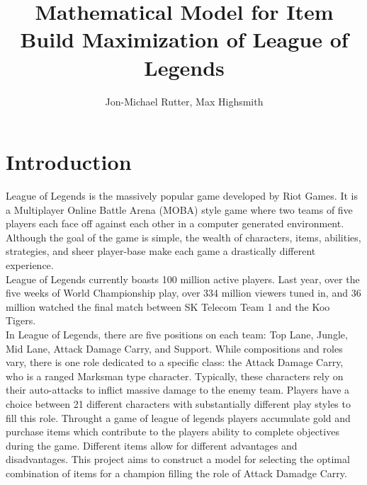 \documentclass{article}
\begin{document}
\title{Mathematical Model for Item Build Maximization of League of Legends}
\author{Jon-Michael Rutter,  Max Highsmith}

\maketitle

\begin{abstract}

\end{abstract}

\section{Introduction}
League of Legends is the massively popular game developed by Riot Games.  It is a Multiplayer Online Battle Arena (MOBA) style game where two teams of five players each face off against each other in a computer generated environment.  Although the goal of the game is simple, the wealth of characters, items, abilities, strategies, and sheer player-base make each game a drastically different experience. \\
League of Legends currently boasts 100 million active players.  Last year, over the five weeks of World Championship play, over 334 million viewers tuned in, and 36 million watched the final match between SK Telecom Team 1 and the Koo Tigers.\\
In League of Legends, there are five positions on each team: Top Lane, Jungle, Mid Lane, Attack Damage Carry, and Support.  While compositions and roles vary, there is one role dedicated to a specific class: the Attack Damage Carry, who is a ranged Marksman type character.  Typically, these characters rely on their auto-attacks to inflict massive damage to the enemy team.  Players have a choice between 21 different characters with substantially different play styles to fill this role.  Throught a game of league of legends players accumulate gold and purchase items which contribute to the players ability to complete objectives during the game.  Different items allow for different advantages and disadvantages.  This project aims to construct a model for selecting the optimal combination of items for a champion filling the role of Attack Damadge Carry.
\newpage
\end{document}
